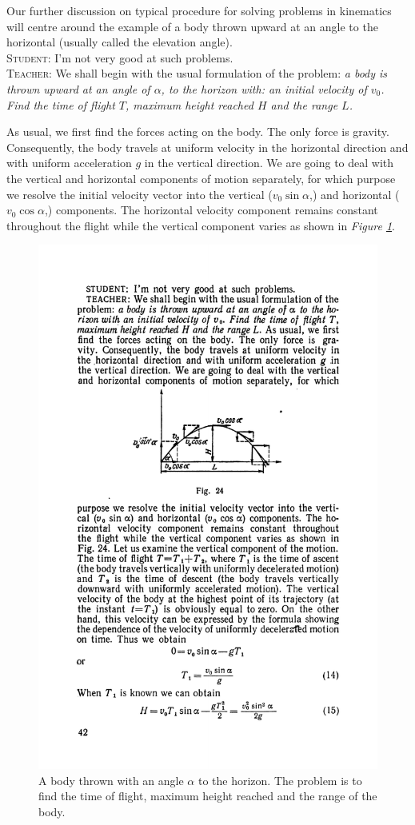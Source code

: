 \documentclass[a4paper,sfsidenotes]{tufte-book}
\begin{document}
Our further discussion on typical procedure for solving problems in kinematics will centre around the example of a body thrown upward at an angle to the horizontal (usually called the elevation angle).
\\
\textsc{Student:} I'm not very good at such problems.
\\
\textsc{Teacher:} We shall begin with the usual formulation of the problem: \emph{a body is thrown upward at an angle of $\alpha$, to the horizon with: an initial velocity of $v_{0}$. Find the time of flight $T$, maximum height reached $H$ and the range $L$.} 

As usual, we first find the forces acting on the body. The only force is gravity. Consequently, the body travels at uniform velocity in the horizontal direction and with uniform acceleration $g$ in the vertical direction. We are going to deal with the vertical and horizontal components of motion separately, for which purpose we resolve the initial velocity vector into the vertical ($v_{0} \sin \alpha$,) and horizontal ($v_{0} \cos \alpha$,) components. The horizontal velocity component remains constant throughout the flight while the vertical component varies as shown in \emph{Figure \ref{fig-24}}. \\
\begin{figure}
\centering
\includegraphics[width=0.7\linewidth]{fig-024a.pdf}
\caption{A body thrown with an angle $\alpha$ to the horizon. The problem is to find the time of flight, maximum height reached and the range of the body.}
\label{fig-24}
\end{figure}
\end{document}
